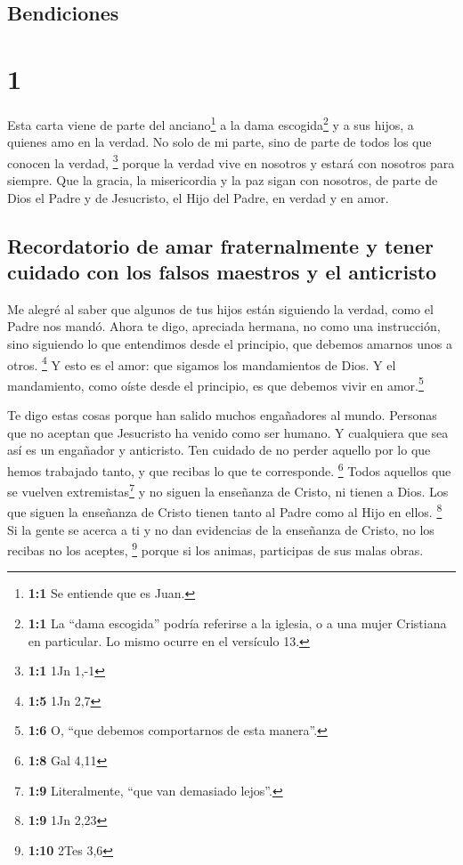 \hypertarget{bendiciones}{%
\subsection{Bendiciones}\label{bendiciones}}

\hypertarget{section}{%
\section{1}\label{section}}

 Esta carta viene de parte del anciano\footnote{\textbf{1:1}
  Se entiende que es Juan.} a la dama escogida\footnote{\textbf{1:1} La
  ``dama escogida'' podría referirse a la iglesia, o a una mujer
  Cristiana en particular. Lo mismo ocurre en el versículo 13.} y a sus
hijos, a quienes amo en la verdad. No solo de mi parte, sino de parte de
todos los que conocen la verdad, \footnote{\textbf{1:1} 1Jn 1,-1}
 porque la verdad vive en nosotros y estará con nosotros
para siempre.  Que la gracia, la misericordia y la paz
sigan con nosotros, de parte de Dios el Padre y de Jesucristo, el Hijo
del Padre, en verdad y en amor.

\hypertarget{recordatorio-de-amar-fraternalmente-y-tener-cuidado-con-los-falsos-maestros-y-el-anticristo}{%
\subsection{Recordatorio de amar fraternalmente y tener cuidado con los
falsos maestros y el
anticristo}\label{recordatorio-de-amar-fraternalmente-y-tener-cuidado-con-los-falsos-maestros-y-el-anticristo}}

 Me alegré al saber que algunos de tus hijos están
siguiendo la verdad, como el Padre nos mandó.  Ahora te
digo, apreciada hermana, no como una instrucción, sino siguiendo lo que
entendimos desde el principio, que debemos amarnos unos a otros.
\footnote{\textbf{1:5} 1Jn 2,7}  Y esto es el amor: que
sigamos los mandamientos de Dios. Y el mandamiento, como oíste desde el
principio, es que debemos vivir en amor.\footnote{\textbf{1:6} O, ``que
  debemos comportarnos de esta manera''.}

 Te digo estas cosas porque han salido muchos engañadores
al mundo. Personas que no aceptan que Jesucristo ha venido como ser
humano. Y cualquiera que sea así es un engañador y anticristo.
 Ten cuidado de no perder aquello por lo que hemos
trabajado tanto, y que recibas lo que te corresponde. \footnote{\textbf{1:8}
  Gal 4,11}  Todos aquellos que se vuelven
extremistas\footnote{\textbf{1:9} Literalmente, ``que van demasiado
  lejos''.} y no siguen la enseñanza de Cristo, ni tienen a Dios. Los
que siguen la enseñanza de Cristo tienen tanto al Padre como al Hijo en
ellos. \footnote{\textbf{1:9} 1Jn 2,23}  Si la gente se
acerca a ti y no dan evidencias de la enseñanza de Cristo, no los
recibas no los aceptes, \footnote{\textbf{1:10} 2Tes 3,6}
 porque si los animas, participas de sus malas obras.

